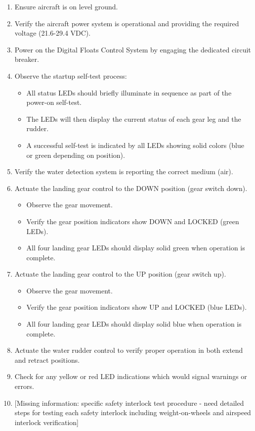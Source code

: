 \documentclass[12pt,a4paper,twoside,openright]{book}
\begin{document}
\begin{enumerate}
    \item Ensure aircraft is on level ground.
    \item Verify the aircraft power system is operational and providing the required voltage (21.6-29.4 VDC).
    \item Power on the Digital Floats Control System by engaging the dedicated circuit breaker.
    \item Observe the startup self-test process:
    \begin{itemize}
            \item All status LEDs should briefly illuminate in sequence as part of the power-on self-test.
            \item The LEDs will then display the current status of each gear leg and the rudder.
            \item A successful self-test is indicated by all LEDs showing solid colors (blue or green depending on position).
    \end{itemize}
    \item Verify the water detection system is reporting the correct medium (air).
    \item Actuate the landing gear control to the DOWN position (gear switch down).
    \begin{itemize}
            \item Observe the gear movement.
            \item Verify the gear position indicators show DOWN and LOCKED (green LEDs).
            \item All four landing gear LEDs should display solid green when operation is complete.
    \end{itemize}
    \item Actuate the landing gear control to the UP position (gear switch up).
    \begin{itemize}
            \item Observe the gear movement.
            \item Verify the gear position indicators show UP and LOCKED (blue LEDs).
            \item All four landing gear LEDs should display solid blue when operation is complete.
    \end{itemize}
    \item Actuate the water rudder control to verify proper operation in both extend and retract positions.
    \item Check for any yellow or red LED indications which would signal warnings or errors.
    \item {\color{red}[Missing information: specific safety interlock test procedure - need detailed steps for testing each safety interlock including weight-on-wheels and airspeed interlock verification]}
\end{enumerate}
\end{document}
